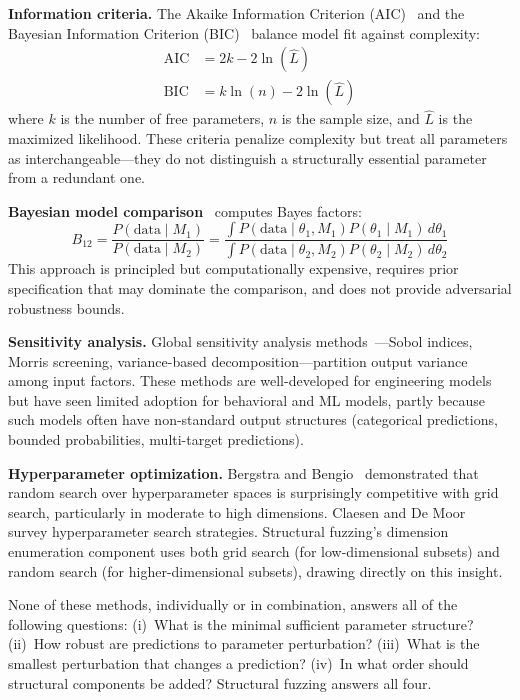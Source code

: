 \documentclass[manuscript,review,anonymous]{acmart}
\begin{document}
\textbf{Information criteria.} The Akaike Information Criterion (AIC)~\cite{burnham2002} and the Bayesian Information Criterion (BIC)~\cite{schwarz1978} balance model fit against complexity:
\begin{align}
    \mathrm{AIC} &= 2k - 2\ln(\hat{L}) \\
    \mathrm{BIC} &= k \ln(n) - 2\ln(\hat{L})
\end{align}
where $k$ is the number of free parameters, $n$ is the sample size, and $\hat{L}$ is the maximized likelihood.
These criteria penalize complexity but treat all parameters as interchangeable---they do not distinguish a structurally essential parameter from a redundant one.

\textbf{Bayesian model comparison}~\cite{kass1995} computes Bayes factors:
\begin{equation}
    B_{12} = \frac{P(\text{data} \mid M_1)}{P(\text{data} \mid M_2)} = \frac{\int P(\text{data} \mid \theta_1, M_1) P(\theta_1 \mid M_1) \, d\theta_1}{\int P(\text{data} \mid \theta_2, M_2) P(\theta_2 \mid M_2) \, d\theta_2}
\end{equation}
This approach is principled but computationally expensive, requires prior specification that may dominate the comparison, and does not provide adversarial robustness bounds.

\textbf{Sensitivity analysis.} Global sensitivity analysis methods~\cite{saltelli2008}---Sobol indices, Morris screening, variance-based decomposition---partition output variance among input factors.
These methods are well-developed for engineering models but have seen limited adoption for behavioral and ML models, partly because such models often have non-standard output structures (categorical predictions, bounded probabilities, multi-target predictions).

\textbf{Hyperparameter optimization.} Bergstra and Bengio~\cite{bergstra2012} demonstrated that random search over hyperparameter spaces is surprisingly competitive with grid search, particularly in moderate to high dimensions.
Claesen and De Moor~\cite{claesen2015} survey hyperparameter search strategies.
Structural fuzzing's dimension enumeration component uses both grid search (for low-dimensional subsets) and random search (for higher-dimensional subsets), drawing directly on this insight.

None of these methods, individually or in combination, answers all of the following questions: (i)~What is the minimal sufficient parameter structure? (ii)~How robust are predictions to parameter perturbation? (iii)~What is the smallest perturbation that changes a prediction? (iv)~In what order should structural components be added?
Structural fuzzing answers all four.
\end{document}
